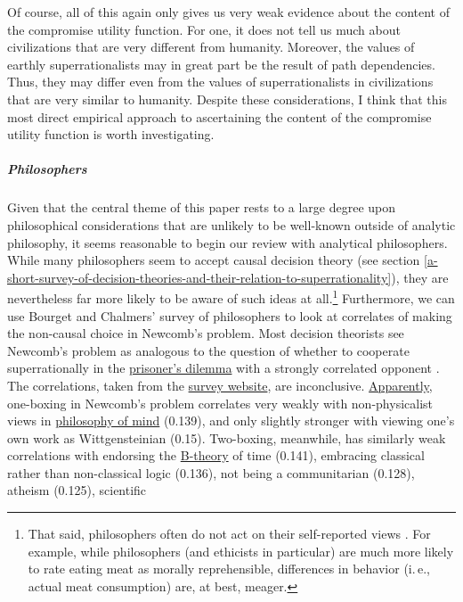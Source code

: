 Of course, all of this again only gives us very weak evidence about the
content of the compromise utility function. For one, it does not tell us
much about civilizations that are very different from humanity. Moreover,
the values of earthly superrationalists may in great part be the result
of path dependencies. Thus, they may differ even from the values of
superrationalists in civilizations that are very similar to humanity.
Despite these considerations, I think that this most direct empirical
approach to ascertaining the content of the compromise utility function
is worth investigating.

\subparagraph{Philosophers}\label{philosophers}

Given that the central theme of this paper rests to a large degree upon
philosophical considerations that are unlikely to be well-known outside
of analytic philosophy, it seems reasonable to begin our review with
analytical philosophers. While many philosophers seem to accept causal
decision theory (see section
\ref{a-short-survey-of-decision-theories-and-their-relation-to-superrationality}), they are nevertheless far more likely to be aware
of such ideas at all.\footnote{That said, philosophers often do not act
    on their self-reported views \parencite{schwitzgebel2011self}. For example, while philosophers (and ethicists in
  particular) are much more likely to rate eating meat as morally
  reprehensible, differences in behavior (i.\,e., actual meat consumption)
  are, at best, meager.} Furthermore, we can use Bourget and Chalmers' \citeyear{Bourget2014-fm}
survey of
philosophers to look at correlates of making the non-causal choice in
Newcomb's problem. Most decision theorists see Newcomb's problem as
analogous to the question of whether to cooperate superrationally in the
\href{https://en.wikipedia.org/wiki/Prisoner\%27s_dilemma}{prisoner's
dilemma} with a strongly correlated opponent \parencite{lewis1979prisoners}.
 The correlations, taken from the
\href{http://philpapers.org/surveys}{survey website}, are
inconclusive.
\href{http://philpapers.org/surveys/linear_most.pl}{Apparently},
one-boxing in Newcomb's problem correlates very weakly with
non-physicalist views in
\href{https://en.wikipedia.org/wiki/Philosophy_of_mind}{philosophy
of mind} (0.139), and only slightly stronger with viewing one's own
work as Wittgensteinian (0.15). Two-boxing, meanwhile, has similarly
weak correlations with endorsing the
\href{https://en.wikipedia.org/wiki/B-theory_of_time}{B-theory}
of time (0.141), embracing classical rather than non-classical logic
(0.136), not being a communitarian (0.128), atheism (0.125), scientific
